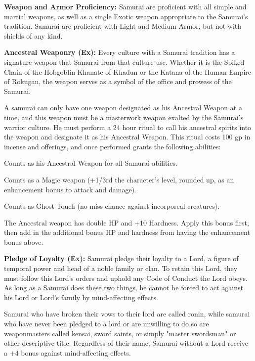 \classfeatures

\textbf{Weapon and Armor Proficiency:} Samurai are proficient with all simple and martial weapons, as well as a single Exotic weapon appropriate to the Samurai's tradition. Samurai are proficient with Light and Medium Armor, but not with shields of any kind.

\textbf{Ancestral Weaponry (Ex):} Every culture with a Samurai tradition has a signature weapon that Samurai from that culture use. Whether it is the Spiked Chain of the Hobgoblin Khanate of Khadun or the Katana of the Human Empire of Rokugan, the weapon serves as a symbol of the office and prowess of the Samurai. 

A samurai can only have one weapon designated as his Ancestral Weapon at a time, and this weapon must be a masterwork weapon exalted by the Samurai's warrior culture. He must perform a 24 hour ritual to call his ancestral spirits into the weapon and designate it as his Ancestral Weapon. This ritual costs 100 gp in incense and offerings, and once performed grants the following abilities:

\begin{itemize*}
\item Counts as his Ancestral Weapon for all Samurai abilities.
\item Counts as a Magic weapon (+1/3rd the character's level, rounded up, as an enhancement bonus to attack and damage).
\item Counts as Ghost Touch (no miss chance against incorporeal creatures).
\item The Ancestral weapon has double HP and +10 Hardness. Apply this bonus first, then add in the additional bonus HP and hardness from having the enhancement bonus above.
\end{itemize*}

\textbf{Pledge of Loyalty (Ex):} Samurai pledge their loyalty to a Lord, a figure of temporal power and head of a noble family or clan. To retain this Lord, they must follow this Lord's orders and uphold any Code of Conduct the Lord obeys. As long as a Samurai does these two things, he cannot be forced to act against his Lord or Lord's family by mind-affecting effects. 

Samurai who have broken their vows to their lord are called ronin, while samurai who have never been pledged to a lord or are unwilling to do so are weaponmasters called kensai, sword saints, or simply "master swordsman" or other descriptive title. Regardless of their name, Samurai without a Lord receive a +4 bonus against mind-affecting effects.

